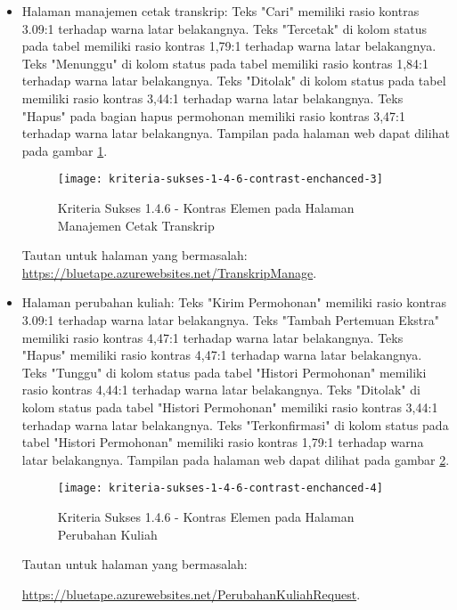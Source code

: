 \begin{itemize}
    \item Halaman manajemen cetak transkrip: Teks "Cari" memiliki rasio kontras 3.09:1 terhadap warna latar belakangnya. Teks "Tercetak" di kolom status pada tabel memiliki rasio kontras 1,79:1 terhadap warna latar belakangnya. Teks "Menunggu" di kolom status pada tabel memiliki rasio kontras 1,84:1 terhadap warna latar belakangnya. Teks "Ditolak" di kolom status pada tabel memiliki rasio kontras 3,44:1 terhadap warna latar belakangnya. Teks "Hapus" pada bagian hapus permohonan memiliki rasio kontras 3,47:1 terhadap warna latar belakangnya. Tampilan pada halaman web dapat dilihat pada gambar \ref{fig:1.4.6_contrast_enchanced_3}.
    \begin{figure}[H]
        \centering  
        \texttt{[image: kriteria-sukses-1-4-6-contrast-enchanced-3]}  
        \caption[Kriteria Sukses 1.4.6 - Kontras Elemen pada Halaman Manajemen Cetak Transkrip]{Kriteria Sukses 1.4.6 - Kontras Elemen pada Halaman Manajemen Cetak Transkrip}
        \label{fig:1.4.6_contrast_enchanced_3}  
    \end{figure} 
    Tautan untuk halaman yang bermasalah: \url{https://bluetape.azurewebsites.net/TranskripManage}.

    \item Halaman perubahan kuliah: Teks "Kirim Permohonan" memiliki rasio kontras 3.09:1 terhadap warna latar belakangnya. Teks "Tambah Pertemuan Ekstra" memiliki rasio kontras 4,47:1 terhadap warna latar belakangnya. Teks "Hapus" memiliki rasio kontras 4,47:1 terhadap warna latar belakangnya. Teks "Tunggu" di kolom status pada tabel "Histori Permohonan" memiliki rasio kontras 4,44:1 terhadap warna latar belakangnya. Teks "Ditolak" di kolom status pada tabel "Histori Permohonan" memiliki rasio kontras 3,44:1 terhadap warna latar belakangnya. Teks "Terkonfirmasi" di kolom status pada tabel "Histori Permohonan" memiliki rasio kontras 1,79:1 terhadap warna latar belakangnya. Tampilan pada halaman web dapat dilihat pada gambar \ref{fig:1.4.6_contrast_enchanced_4}.
    \begin{figure}[H]
        \centering  
        \texttt{[image: kriteria-sukses-1-4-6-contrast-enchanced-4]}  
        \caption[Kriteria Sukses 1.4.6 - Kontras Elemen pada Halaman Perubahan Kuliah]{Kriteria Sukses 1.4.6 - Kontras Elemen pada Halaman Perubahan Kuliah}
        \label{fig:1.4.6_contrast_enchanced_4}  
    \end{figure} 
    Tautan untuk halaman yang bermasalah: 
    
    \url{https://bluetape.azurewebsites.net/PerubahanKuliahRequest}.
    

\end{itemize}
